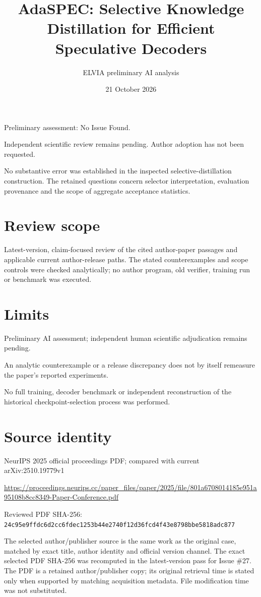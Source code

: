 \documentclass[11pt]{article}
\begin{document}
\title{AdaSPEC: Selective Knowledge Distillation for Efficient Speculative Decoders}

\author{ELVIA preliminary AI analysis}\date{21 October 2026}\maketitle

Preliminary assessment: No Issue Found.\par

Independent scientific review remains pending. Author adoption has not been requested.

No substantive error was established in the inspected selective-distillation construction. The retained questions concern selector interpretation, evaluation provenance and the scope of aggregate acceptance statistics.

\section*{Review scope}

Latest-version, claim-focused review of the cited author-paper passages and applicable current author-release paths. The stated counterexamples and scope controls were checked analytically; no author program, old verifier, training run or benchmark was executed.

\section*{Limits}

Preliminary AI assessment; independent human scientific adjudication remains pending.\par

An analytic counterexample or a release discrepancy does not by itself remeasure the paper’s reported experiments.\par

No full training, decoder benchmark or independent reconstruction of the historical checkpoint-selection process was performed.\par

\section*{Source identity}

NeurIPS 2025 official proceedings PDF; compared with current arXiv:2510.19779v1

\url{https://proceedings.neurips.cc/paper_files/paper/2025/file/801a6708014185e951a95108b8cc8349-Paper-Conference.pdf}

Reviewed PDF SHA-256: \nolinkurl{24c95e9ffdc6d2cc6fdec1253b44e2740f12d36fcd4f43e8798bbe5818adc877}

The selected author/publisher source is the same work as the original case, matched by exact title, author identity and official version channel. The exact selected PDF SHA-256 was recomputed in the latest-version pass for Issue \#27. The PDF is a retained author/publisher copy; its original retrieval time is stated only when supported by matching acquisition metadata. File modification time was not substituted.
\end{document}
